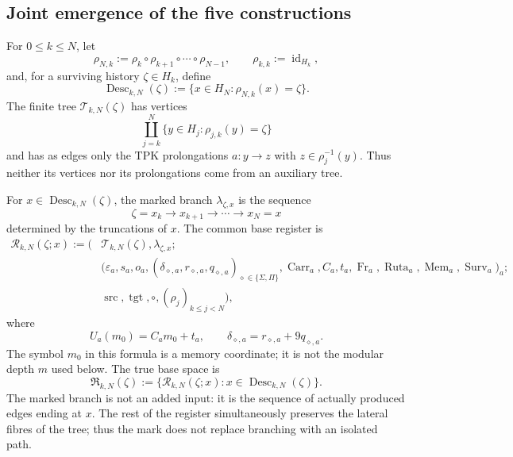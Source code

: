 \subsection{Joint emergence of the five constructions}
\label{hmtfg:base:sec:cinco-construcciones-continuo-ch}

For \(0\leq k\leq N\), let
\[
 \rho_{N,k}:=\rho_k\circ\rho_{k+1}\circ\cdots\circ\rho_{N-1},
 \qquad \rho_{k,k}:=\operatorname{id}_{H_k},
\]
and, for a surviving history \(\zeta\in H_k\), define
\[
 \operatorname{Desc}_{k,N}(\zeta)
 :=\{x\in H_N:\rho_{N,k}(x)=\zeta\}.
\]
The finite tree \(\mathscr T_{k,N}(\zeta)\) has vertices
\[
 \coprod_{j=k}^{N}\{y\in H_j:\rho_{j,k}(y)=\zeta\}
\]
and has as edges only the TPK prolongations
\(a:y\to z\) with \(z\in\rho_j^{-1}(y)\). Thus neither its vertices nor
its prolongations come from an auxiliary tree.

For \(x\in\operatorname{Desc}_{k,N}(\zeta)\), the marked branch
\(\lambda_{\zeta,x}\) is the sequence
\[
 \zeta=x_k\longrightarrow x_{k+1}\longrightarrow\cdots
 \longrightarrow x_N=x
\]
determined by the truncations of \(x\). The common base register is
\[
\begin{aligned}
 \mathscr R_{k,N}(\zeta;x):=
 \bigl(&\mathscr T_{k,N}(\zeta),\lambda_{\zeta,x};\\
 &\bigl(\varepsilon_a,s_a,o_a,
   (\delta_{\diamond,a},r_{\diamond,a},q_{\diamond,a})
       _{\diamond\in\{\Sigma,\Pi\}},
   \operatorname{Carr}_a,C_a,t_a,\operatorname{Fr}_a,
   \operatorname{Ruta}_a,\operatorname{Mem}_a,
   \operatorname{Surv}_a\bigr)_a;\\
 &\operatorname{src},\operatorname{tgt},\circ,
   (\rho_j)_{k\leq j<N}\bigr),
\end{aligned}
\tag{C1}
\label{hmtfg:base:eq:base-comun-registros}
\]
where
\[
 U_a(m_0)=C_am_0+t_a,
 \qquad
 \delta_{\diamond,a}=r_{\diamond,a}+9q_{\diamond,a}.
\]
The symbol \(m_0\) in this formula is a memory coordinate; it is not the
modular depth \(m\) used below. The true base space is
\[
 \mathfrak R_{k,N}(\zeta)
 :=\{\mathscr R_{k,N}(\zeta;x):
       x\in\operatorname{Desc}_{k,N}(\zeta)\}.
\]
The marked branch is not an added input: it is the sequence of actually
produced edges ending at \(x\). The rest of the register simultaneously
preserves the lateral fibres of the tree; thus the mark does not replace
branching with an isolated path.

